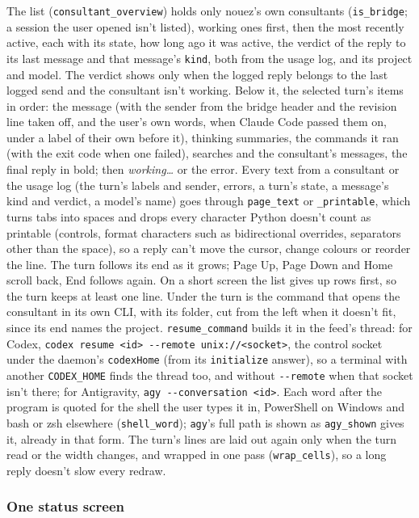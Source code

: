 \documentclass[10pt,a4paper]{article}
\newcommand{\code}[1]{\texttt{#1}}
\begin{document}
The list (\code{consultant\_overview}) holds only nouez's own consultants (\code{is\_bridge}; a
session the user opened isn't listed), working ones first, then the most recently active, each
with its state, how long ago it was active, the verdict of the reply to its last message and that
message's \code{kind}, both from the usage log, and its project and model. The verdict shows only
when the logged reply belongs to the last logged send and the consultant isn't working. Below it, the
selected turn's items in order: the message (with the sender from the bridge header and the revision
line taken off, and the user's own words, when Claude Code passed them on, under a label of their own before it), thinking summaries, the commands it ran (with the exit code when one failed), searches
and the consultant's messages, the final reply in bold; then \emph{working…} or the error. Every
text from a consultant or the usage log (the turn's labels and sender, errors, a turn's state, a
message's kind and verdict, a model's name) goes through \code{page\_text} or \code{\_printable}, which turns tabs into spaces and drops
every character Python doesn't count as printable (controls, format characters such as
bidirectional overrides, separators other than the space), so a reply can't move the
cursor, change colours or reorder the line. The turn follows its end as it grows; Page Up, Page
Down and Home scroll back, End follows again. On a short screen the list gives up rows first, so
the turn keeps at least one line. Under the turn is the command that opens the consultant in its
own CLI, with its folder, cut from the left when it doesn't fit, since its end names the project.
\code{resume\_command} builds it in the feed's thread: for Codex, \code{codex resume <id> -{}-remote
unix://<socket>}, the control socket under the daemon's \code{codexHome} (from its \code{initialize}
answer), so a terminal with another \code{CODEX\_HOME} finds the thread too, and without
\code{-{}-remote} when that socket isn't there; for Antigravity, \code{agy -{}-conversation <id>}. Each
word after the program is quoted for the shell the user types it in, PowerShell on Windows and
bash or zsh elsewhere (\code{shell\_word}); \code{agy}'s full path is shown as
\code{agy\_shown} gives it, already in that form. The turn's
lines are laid out again only when the turn read or the width changes, and wrapped in one pass
(\code{wrap\_cells}), so a long reply doesn't slow every redraw.

\subsubsection*{One status screen}
\end{document}
